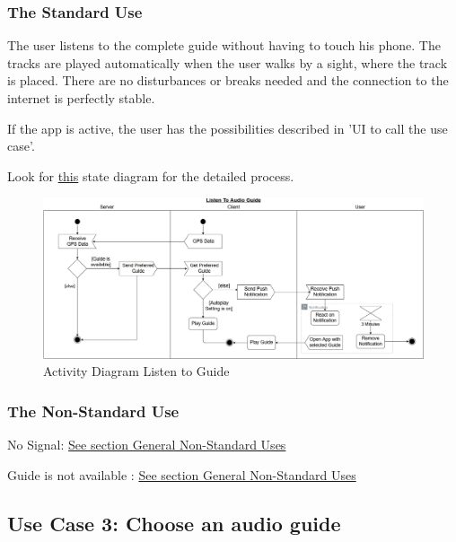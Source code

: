 \documentclass[12pt]{article}
\theoremstyle{definition}
\newenvironment{text}{
   \setlength{\parindent}{0pt}
   \color{black}
}{}
\begin{document}
    \subsubsection{The Standard Use}
    \begin{text}
    The user listens to the complete guide without having to touch his phone. The tracks are played automatically when the user walks by a sight, where the track is placed. There are no disturbances or breaks needed and the connection to the internet is perfectly stable.
    
    If the app is active, the user has the possibilities described in 'UI to call the use case'.
    
    Look for
    \hyperref[fig:listen_act_dg]{this}
    state diagram for the detailed process.
    \end{text}
    
    \begin{figure}
        \vspace*{-3cm}
        \centering
        \label{fig:listen_act_dg}
        \includegraphics[width=1.1\textheight,
       angle=90]{ActivityDiagram/GuideListeningAD.png}
        \caption{Activity Diagram Listen to Guide}
    \end{figure}
    
    \subsubsection{The Non-Standard Use}
    \begin{text}
    
    No Signal: \hyperref[sec:gnsu]{See section General Non-Standard Uses }
    
    Guide is not available : \hyperref[sec:gnsu]{See section General Non-Standard Uses }
    \end{text}
\pagebreak

\subsection{Use Case 3: Choose an audio guide}
\label{chooseguide}
\end{document}
